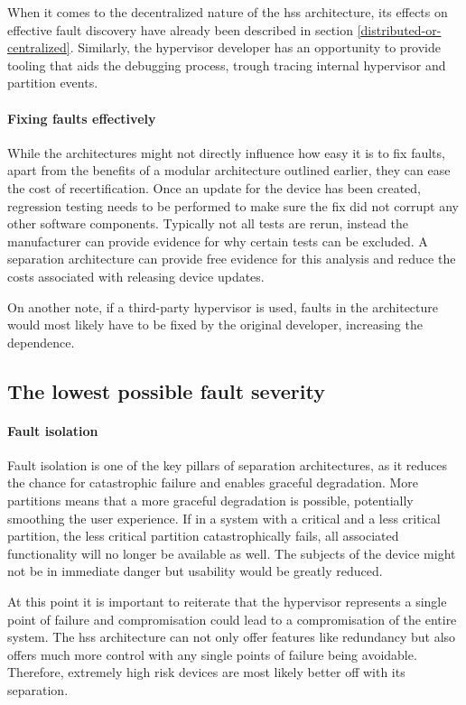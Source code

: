 When it comes to the decentralized nature of the \acrshort{hss} architecture, its effects on effective fault discovery have already been described in section \ref{distributed-or-centralized}. Similarly, the hypervisor developer has an opportunity to provide tooling that aids the debugging process, trough tracing internal hypervisor and partition events.

\paragraph{Fixing faults effectively} \label{effective-fault-fixing}
While the architectures might not directly influence how easy it is to fix faults, apart from the benefits of a modular architecture outlined earlier, they can ease the cost of recertification. Once an update for the device has been created, regression testing needs to be performed to make sure the fix did not corrupt any other software components. Typically not all tests are rerun, instead the manufacturer can provide evidence for why certain tests can be excluded. A separation architecture can provide free evidence for this analysis and reduce the costs associated with releasing device updates.

On another note, if a third-party hypervisor is used, faults in the architecture would most likely have to be fixed by the original developer, increasing the dependence.

\subsection{The lowest possible fault severity}
\paragraph{Fault isolation}
Fault isolation is one of the key pillars of separation architectures, as it reduces the chance for catastrophic failure and enables graceful degradation. More partitions means that a more graceful degradation is possible, potentially smoothing the user experience. If in a system with a critical and a less critical partition, the less critical partition catastrophically fails, all associated functionality will no longer be available as well. The subjects of the device might not be in immediate danger but usability would be greatly reduced.

At this point it is important to reiterate that the hypervisor represents a single point of failure and compromisation could lead to a compromisation of the entire system. The \acrshort{hss} architecture can not only offer features like redundancy but also offers much more control with any single points of failure being avoidable. Therefore, extremely high risk devices are most likely better off with its separation.

